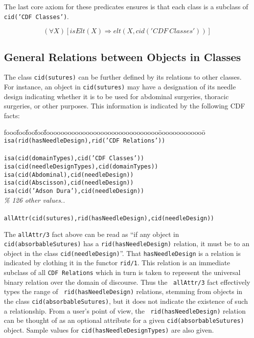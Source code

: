 The last core axiom for these predicates ensures is that each class is
a subclass of {\tt cid('CDF Classes')}.

\begin{axiom} \label{ax:contained}
\[ (\forall X) [isElt(X) \Rightarrow elt(X,cid('CDF\ Classes'))] \]
\end{axiom} 

\subsection{General Relations between Objects in  Classes}

\begin{example} \rm \label{ex:suture2}
The class {\tt cid(sutures)} can be further defined by its relations
to other classes.  For instance, an object in {\tt cid(sutures)} may
have a designation of its needle design indicating whether it is to be
used for abdominal surgeries, thoracic surgeries, or other purposes.
This information is indicated by the following CDF facts:
%
{\small
\begin{tabbing}
fooo\=foo\=foo\=foo\=fooooooooooooooooooooooooooooooo\=ooooooooooooo\=\kill
\> {\tt isa(rid(hasNeedleDesign),rid('CDF Relations'))} \\
\\
\> {\tt isa(cid(domainTypes),cid('CDF Classes'))} \\
\> \> {\tt isa(cid(needleDesignTypes),cid(domainTypes))} \\
\> \> \> {\tt isa(cid(Abdominal),cid(needleDesign))} \\
\> \> \> {\tt isa(cid(Abscisson),cid(needleDesign))} \\
\> \> \> {\tt isa(cid('Adson Dura'),cid(needleDesign))} \\
\> {\it \% 126 other values..}  \\
\\
\> {\tt allAttr(cid(sutures),rid(hasNeedleDesign),cid(needleDesign))} 
\end{tabbing}
}
%
\noindent
The {\tt allAttr/3} fact above can be read as ``if any object in {\tt
cid(absorbableSutures)} has a {\tt rid(hasNeedleDesign)} relation, it
must be to an object in the class {\tt cid(needleDesign)}''.  That
{\tt hasNeedleDesign} is a relation is indicated by clothing it in the
functor {\tt rid/1}.  This relation is an immediate subclass of all
{\tt CDF Relations} which in turn is taken to represent the universal
binary relation over the domain of discourse.  Thus the {\tt
allAttr/3} fact effectively types the range of {\tt
rid(hasNeedleDesign)} relations, stemming from objects in the class
{\tt cid(absorbableSutures)}, but it does not indicate the existence
of such a relationship.  From a user's point of view, the {\tt
rid(hasNeedleDesign)} relation can be thought of as an optional
attribute for a given {\tt cid(absorbableSutures)} object.  Sample
values for {\tt cid(hasNeedleDesignTypes)} are also given.
\end{example} 

